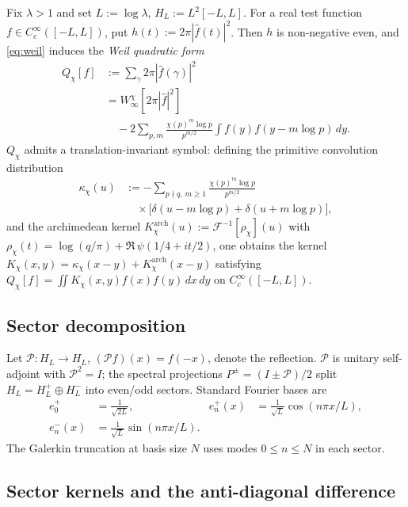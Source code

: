 \documentclass[10pt,twocolumn]{article}
\theoremstyle{definition}
\theoremstyle{remark}
\newcommand{\chifn}{\chi}
\begin{document}
Fix $\lambda>1$ and set $L:=\log\lambda$, $H_L:=L^2[-L,L]$. For a
real test function $f\in C_c^\infty([-L,L])$, put
$h(t):=2\pi|\hat f(t)|^2$. Then $h$ is non-negative even, and
\eqref{eq:weil} induces the \emph{Weil quadratic form}
\begin{equation}
\label{eq:weil-qf}
\begin{aligned}
  Q_{\chifn}[f]
    &:=\sum_{\gamma}2\pi|\hat f(\gamma)|^2 \\
    &=W^{\chifn}_\infty[2\pi|\hat f|^2] \\
    &\quad -2\sum_{p,m}\frac{\chifn(p)^m\log p}{p^{m/2}}
      \int f(y)f(y-m\log p)\,dy.
\end{aligned}
\end{equation}
$Q_{\chifn}$ admits a translation-invariant symbol: defining the
primitive convolution distribution
\begin{equation}
\label{eq:kappa}
\begin{aligned}
  \kappa_{\chifn}(u)
    &:=-\sum_{p\nmid q,\,m\geq 1}
      \frac{\chifn(p)^m\log p}{p^{m/2}} \\
    &\quad\times
      \bigl[\delta(u-m\log p)+\delta(u+m\log p)\bigr],
\end{aligned}
\end{equation}
and the archimedean kernel
$K^{\mathrm{arch}}_{\chifn}(u):=\mathcal{F}^{-1}[\rho_{\chifn}](u)$
with $\rho_{\chifn}(t)=\log(q/\pi)+\Re\,\psi(1/4+it/2)$, one obtains
the kernel
$K_{\chifn}(x,y)=\kappa_{\chifn}(x-y)+K^{\mathrm{arch}}_{\chifn}(x-y)$
satisfying $Q_{\chifn}[f]=\iint K_{\chifn}(x,y)f(x)f(y)\,dx\,dy$ on
$C_c^\infty([-L,L])$.

\subsection{Sector decomposition}

Let $\mathcal{P}:H_L\to H_L$, $(\mathcal{P}f)(x)=f(-x)$, denote the
reflection. $\mathcal{P}$ is unitary self-adjoint with $\mathcal{P}^2
=I$; the spectral projections $P^\pm=(I\pm\mathcal{P})/2$ split
$H_L=H_L^+\oplus H_L^-$ into even/odd sectors. Standard Fourier bases
are
\[
\begin{aligned}
  e_0^+&=\tfrac{1}{\sqrt{2L}}, &
  e_n^+(x)&=\tfrac{1}{\sqrt L}\cos(n\pi x/L),\\
  e_n^-(x)&=\tfrac{1}{\sqrt L}\sin(n\pi x/L).
\end{aligned}
\]
The Galerkin truncation at basis size $N$ uses modes $0\leq n\leq N$
in each sector.

\subsection{Sector kernels and the anti-diagonal difference}
\end{document}
